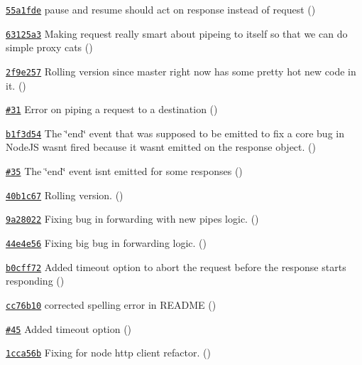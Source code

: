 \begin{DoxyItemize}
\item \href{https://github.com/mikeal/request/commit/55a1fdedcad1e291502ce10010dda7e478a1b503}{\tt 55a1fde} pause and resume should act on response instead of request ()
\item \href{https://github.com/mikeal/request/commit/63125a33523e72e449ceef76da57b63522998282}{\tt 63125a3} Making request really smart about pipeing to itself so that we can do simple proxy cats ()
\item \href{https://github.com/mikeal/request/commit/2f9e257bc39eb329eec660c6d675fb40172fc5a5}{\tt 2f9e257} Rolling version since master right now has some pretty hot new code in it. ()
\item \href{https://github.com/mikeal/request/pull/31}{\tt \#31} Error on piping a request to a destination ()
\item \href{https://github.com/mikeal/request/commit/b1f3d5439d24b848b2bf3a6459eea74cb0e43df3}{\tt b1f3d54} The \char`\"{}end\char`\"{} event that was supposed to be emitted to fix a core bug in Node\+J\+S wasn\textquotesingle{}t fired because it wasn\textquotesingle{}t emitted on the response object. ()
\item \href{https://github.com/mikeal/request/pull/35}{\tt \#35} The \char`\"{}end\char`\"{} event isn\textquotesingle{}t emitted for some responses ()
\item \href{https://github.com/mikeal/request/commit/40b1c676e1d3a292719ad2dd9cf9354c101bad47}{\tt 40b1c67} Rolling version. ()
\item \href{https://github.com/mikeal/request/commit/9a28022d0e438d0028e61a53e897689470025e50}{\tt 9a28022} Fixing bug in forwarding with new pipes logic. ()
\item \href{https://github.com/mikeal/request/commit/44e4e5605b0a9e02036393bcbd3a8d91280f5611}{\tt 44e4e56} Fixing big bug in forwarding logic. ()
\item \href{https://github.com/mikeal/request/commit/b0cff72d63689d96e0b1d49a8a5aef9ccc71cb8b}{\tt b0cff72} Added timeout option to abort the request before the response starts responding ()
\item \href{https://github.com/mikeal/request/commit/cc76b109590437bfae54116e3424b2c6e44a3b3e}{\tt cc76b10} corrected spelling error in R\+E\+A\+D\+M\+E ()
\item \href{https://github.com/mikeal/request/pull/45}{\tt \#45} Added timeout option ()
\item \href{https://github.com/mikeal/request/commit/1cca56b29bb670c53d5995e76c0b075a747b5ad7}{\tt 1cca56b} Fixing for node http client refactor. ()

\end{DoxyItemize}
